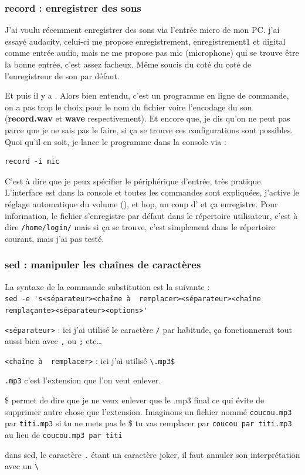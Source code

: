 \documentclass[a4paper,twoside]{article}
\begin{document}
\subsubsection{record : enregistrer des sons}
J'ai voulu récemment enregistrer des sons via l'entrée micro de mon PC. j'ai essayé audacity, celui-ci me propose enregistrement, enregistrement1 et digital comme entrée audio, mais ne me propose pas mic (microphone) qui se trouve être la bonne entrée, c'est assez facheux. Même soucis du coté du coté de l'enregistreur de son par défaut.

Et puis il y a . Alors bien entendu, c'est un programme en ligne de commande, on a pas trop le choix pour le nom du fichier voire l'encodage du son (\textbf{record.wav} et \textbf{wave} respectivement). Et encore que, je dis qu'on ne peut pas parce que je ne sais pas le faire, si ça se trouve ces configurations sont possibles. Quoi qu'il en soit, je lance le programme dans la console via :

\begin{verbatim}
record -i mic
\end{verbatim}

C'est à dire que je peux spécifier le périphérique d'entrée, très pratique. L'interface est dans la console et toutes les commandes sont expliquées, j'active le réglage automatique du volume (), et hop, un coup d' et ça enregistre. Pour information, le fichier s'enregistre par défaut dans le répertoire utilisateur, c'est à dire \verb|/home/login/| mais si ça se trouve, c'est simplement dans le répertoire courant, mais j'ai pas testé.

\subsubsection{sed : manipuler les chaînes de caractères}
La syntaxe de la commande substitution est la suivante :\\
{\footnotesize\verb|sed -e 's|{\red \verb|<séparateur>|}{\blue \verb|<chaîne à  remplacer>|}{\red \verb|<séparateur>|}{\blue \verb|<chaîne remplaçante>|}{\red \verb|<séparateur>|}{\blue \verb|<options>|}\verb|'|}

{\red \verb|<séparateur>|} : ici j'ai utilisé le caractère \verb|/| par habitude, ça fonctionnerait tout aussi bien avec \verb|,| ou \verb|;| etc\ldots

{\blue \verb|<chaîne à  remplacer>|} : ici j'ai utilisé \verb|\.mp3$|
\begin{description}
\item \verb|.mp3| c'est l'extension que l'on veut enlever.
\item \$ permet de dire que je ne veux enlever que le .mp3 final ce qui évite de supprimer autre chose que l'extension. Imaginons un fichier nommé \verb|coucou.mp3| par \verb|titi.mp3| si tu ne mets pas le \$ tu vas remplacer par \verb|coucou par titi.mp3| au lieu de \verb|coucou.mp3 par titi|
\item dans sed, le caractère \verb|.| étant un caractère joker, il faut annuler son interprétation avec un \verb|\|
\end{description}
\end{document}
